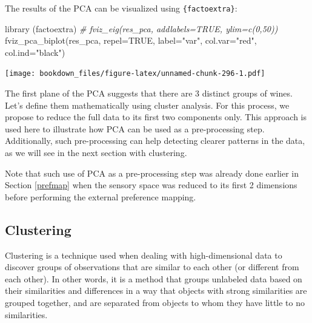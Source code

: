 \documentclass[
]{krantz}
\makeatletter
\newenvironment{Shaded}{\begin{snugshade}}{\end{snugshade}}
\newcommand{\AttributeTok}[1]{\textcolor[rgb]{0.61,0.61,0.61}{#1}}
\newcommand{\CommentTok}[1]{\textcolor[rgb]{0.37,0.37,0.37}{\textit{#1}}}
\newcommand{\ConstantTok}[1]{\textcolor[rgb]{0,0,0}{#1}}
\newcommand{\DecValTok}[1]{\textcolor[rgb]{0.06,0.06,0.06}{#1}}
\newcommand{\FunctionTok}[1]{\textcolor[rgb]{0,0,0}{#1}}
\newcommand{\NormalTok}[1]{#1}
\newcommand{\OtherTok}[1]{\textcolor[rgb]{0.37,0.37,0.37}{#1}}
\newcommand{\SpecialCharTok}[1]{\textcolor[rgb]{0,0,0}{#1}}
\newcommand{\StringTok}[1]{\textcolor[rgb]{0.5,0.5,0.5}{#1}}
\renewenvironment{quote}{\begin{VF}}{\end{VF}}
\newenvironment{kframe}{%
\medskip{}
\setlength{\fboxsep}{.8em}
 \def\at@end@of@kframe{}%
 \ifinner\ifhmode%
  \def\at@end@of@kframe{\end{minipage}}%
  \begin{minipage}{\columnwidth}%
 \fi\fi%
 \def\FrameCommand##1{\hskip\@totalleftmargin \hskip-\fboxsep
 \colorbox{shadecolor}{##1}\hskip-\fboxsep
     \hskip-\linewidth \hskip-\@totalleftmargin \hskip\columnwidth}%
 \MakeFramed {\advance\hsize-\width
   \@totalleftmargin\z@ \linewidth\hsize
   \@setminipage}}%
 {\par\unskip\endMakeFramed%
 \at@end@of@kframe}
\renewenvironment{Shaded}{\begin{kframe}}{\end{kframe}}
\makeatother
\begin{document}
The results of the PCA can be visualized using \texttt{\{factoextra\}}:

\begin{Shaded}
\begin{Highlighting}[]
\FunctionTok{library}\NormalTok{ (factoextra)}
\CommentTok{\# fviz\_eig(res\_pca, addlabels=TRUE, ylim=c(0,50))}
\FunctionTok{fviz\_pca\_biplot}\NormalTok{(res\_pca, }\AttributeTok{repel=}\ConstantTok{TRUE}\NormalTok{, }\AttributeTok{label=}\StringTok{"var"}\NormalTok{, }\AttributeTok{col.var=}\StringTok{"red"}\NormalTok{, }\AttributeTok{col.ind=}\StringTok{"black"}\NormalTok{)}
\end{Highlighting}
\end{Shaded}

\texttt{[image: bookdown\_files/figure-latex/unnamed-chunk-296-1.pdf]}

The first plane of the PCA suggests that there are 3 distinct groups of wines. Let's define them mathematically using cluster analysis. For this process, we propose to reduce the full data to its first two components only. This approach is used here to illustrate how PCA can be used as a pre-processing step. Additionally, such pre-processing can help detecting clearer patterns in the data, as we will see in the next section with clustering.

\begin{quote}
Note that such use of PCA as a pre-processing step was already done earlier in Section \ref{prefmap} when the sensory space was reduced to its first 2 dimensions before performing the external preference mapping.
\end{quote}

\begin{Shaded}
\end{Shaded}

\hypertarget{clustering}{%
\subsection{Clustering}\label{clustering}}

Clustering is a technique used when dealing with high-dimensional data to discover groups of observations that are similar to each other (or different from each other). In other words, it is a method that groups unlabeled data based on their similarities and differences in a way that objects with strong similarities are grouped together, and are separated from objects to whom they have little to no similarities.
\end{document}
